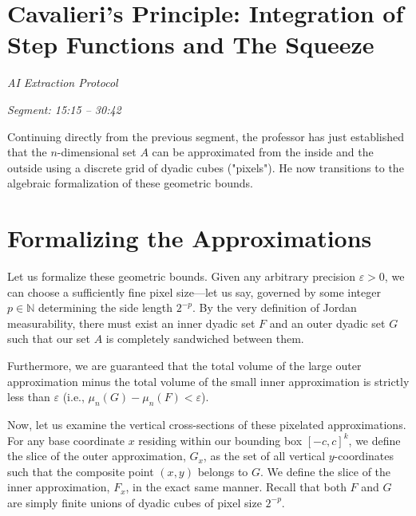 \section{Cavalieri's Principle: Integration of Step Functions and The Squeeze}

\emph{AI Extraction Protocol}

\textit{Segment: 15:15 -- 30:42}


\begin{meta-note}
Continuing directly from the previous segment, the professor has just established that the $n$-dimensional set $A$ can be approximated from the inside and the outside using a discrete grid of dyadic cubes ("pixels"). He now transitions to the algebraic formalization of these geometric bounds.
\end{meta-note}

\section{Formalizing the Approximations}

\begin{spoken-clean}[15:15 - 18:22]
Let us formalize these geometric bounds. Given any arbitrary precision $\varepsilon > 0$, we can choose a sufficiently fine pixel size—let us say, governed by some integer $p \in \mathbb{N}$ determining the side length $2^{-p}$. By the very definition of Jordan measurability, there must exist an inner dyadic set $F$ and an outer dyadic set $G$ such that our set $A$ is completely sandwiched between them.

Furthermore, we are guaranteed that the total volume of the large outer approximation minus the total volume of the small inner approximation is strictly less than $\varepsilon$ (i.e., $\mu_n(G) - \mu_n(F) < \varepsilon$). 

Now, let us examine the vertical cross-sections of these pixelated approximations. For any base coordinate $x$ residing within our bounding box $[-c, c]^k$, we define the slice of the outer approximation, $G_x$, as the set of all vertical $y$-coordinates such that the composite point $(x,y)$ belongs to $G$. We define the slice of the inner approximation, $F_x$, in the exact same manner. Recall that both $F$ and $G$ are simply finite unions of dyadic cubes of pixel size $2^{-p}$.
\end{spoken-clean}

